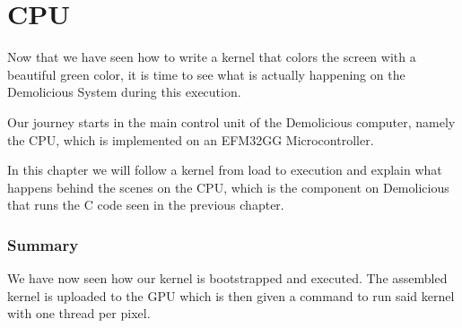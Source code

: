 \documentclass[../main/report.tex]{subfiles}
\begin{document}
\chapter{CPU}

Now that we have seen how to write a kernel that colors the screen with a beautiful green color, 
it is time to see what is actually happening on the Demolicious System during this execution. 

Our journey starts in the main control unit of the Demolicious computer, namely the CPU, which is implemented on an EFM32GG Microcontroller.

In this chapter we will follow a kernel from load to execution and explain what happens behind the scenes on the CPU, which is the component on Demolicious that runs the C code seen in the previous chapter.











\subsection{Summary}

We have now seen how our kernel is bootstrapped and executed.
The assembled kernel is uploaded to the GPU which is then given a command to run said kernel with one thread per pixel.
\end{document}
